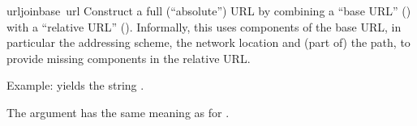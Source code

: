 \begin{funcdesc}{urljoin}{base\, url}
Construct a full (``absolute'') URL by combining a ``base URL''
() with a ``relative URL'' ().  Informally, this
uses components of the base URL, in particular the addressing scheme,
the network location and (part of) the path, to provide missing
components in the relative URL.

Example:
 yields the string
.

The  argument has the same meaning as for
.
\end{funcdesc}
